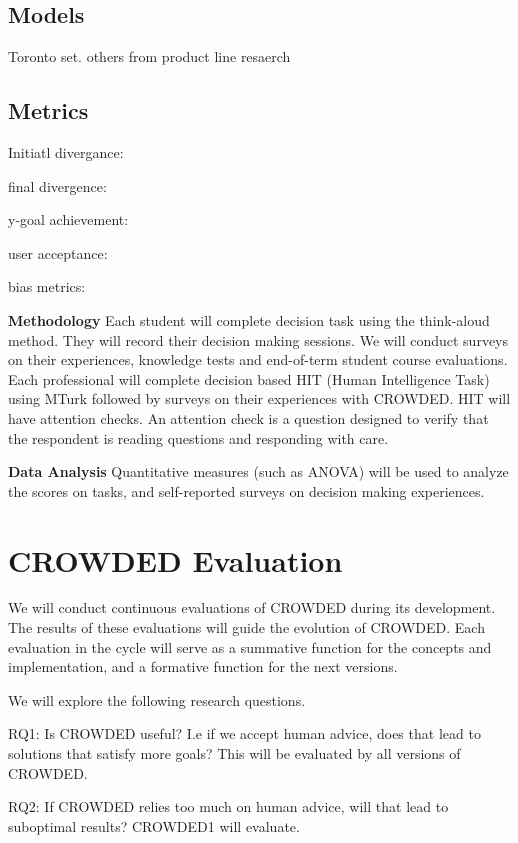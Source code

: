 \subsection{Models}
Toronto set. others from product line resaerch

\subsection{Metrics}

Initiatl divergance:

final divergence:

y-goal achievement:

user acceptance:

bias metrics: 

\textbf{Methodology} Each student will complete decision task using the think-aloud method. They will record their decision making sessions. We will conduct surveys on their experiences, knowledge tests and end-of-term student course evaluations. Each professional will complete decision based HIT (Human Intelligence Task) using MTurk followed by surveys on their experiences with CROWDED. HIT will have attention checks. An attention check is a question designed to verify that the respondent is reading questions and responding with care. 


\textbf{Data Analysis} Quantitative measures (such as ANOVA) will be used to analyze the scores on tasks, and self-reported surveys on decision making experiences. 

\section{CROWDED Evaluation}
We will conduct continuous evaluations of CROWDED during its development. The results of these evaluations will guide the evolution of CROWDED.  Each evaluation in the cycle will serve as a summative function for the concepts and implementation, and a formative function for the next versions.

We will explore the following research questions.
\bi
\item RQ1: Is  CROWDED useful? I.e if we accept human advice, does that lead to solutions that satisfy more goals? This will be evaluated by all versions of CROWDED.

\item RQ2: If CROWDED relies too much on human advice, will that lead to suboptimal results? CROWDED1 will evaluate.


